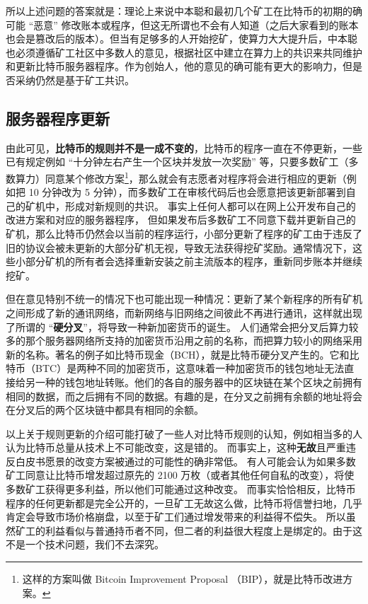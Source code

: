 所以上述问题的答案就是：理论上来说中本聪和最初几个矿工在比特币的初期的确可能 “恶意” 修改账本或程序，但这无所谓也不会有人知道（之后大家看到的账本也会是篡改后的版本）。但当有足够多的人开始挖矿，使算力大大提升后，中本聪也必须遵循矿工社区中多数人的意见，根据社区中建立在算力上的共识来共同维护和更新比特币服务器程序。作为创始人，他的意见的确可能有更大的影响力，但是否采纳仍然是基于矿工共识。

\subsection{服务器程序更新}
由此可见，\textbf{比特币的规则并不是一成不变的}，比特币的程序一直在不停更新，一些已有规定例如 “十分钟左右产生一个区块并发放一次奖励” 等，只要多数矿工（多数算力）同意某个修改方案\footnote{这样的方案叫做 Bitcoin Improvement Proposal （BIP），就是比特币改进方案。}，那么就会有志愿者对程序将会进行相应的更新（例如把 10 分钟改为 5 分钟），而多数矿工在审核代码后也会愿意把该更新部署到自己的矿机中，形成对新规则的共识。 事实上任何人都可以在网上公开发布自己的改进方案和对应的服务器程序， 但如果发布后多数矿工不同意下载并更新自己的矿机，那么比特币仍然会以当前的程序运行，小部分更新了程序的矿工由于违反了旧的协议会被未更新的大部分矿机无视，导致无法获得挖矿奖励。通常情况下，这些小部分矿机的所有者会选择重新安装之前主流版本的程序，重新同步账本并继续挖矿。

但在意见特别不统一的情况下也可能出现一种情况：更新了某个新程序的所有矿机之间形成了新的通讯网络，而新网络与旧网络之间彼此不再进行通讯，这样就出现了所谓的 “\textbf{硬分叉}”，将导致一种新加密货币的诞生。 人们通常会把分叉后算力较多的那个服务器网络所支持的加密货币沿用之前的名称，而把算力较小的网络采用新的名称。著名的例子如比特币现金（BCH），就是比特币硬分叉产生的。它和比特币（BTC）是两种不同的加密货币，这意味着一种加密货币的钱包地址无法直接给另一种的钱包地址转账。他们的各自的服务器中的区块链在某个区块之前拥有相同的数据，而之后拥有不同的数据。有趣的是，在分叉之前拥有余额的地址将会在分叉后的两个区块链中都具有相同的余额。

以上关于规则更新的介绍可能打破了一些人对比特币规则的认知，例如相当多的人认为比特币总量从技术上不可能改变，这是错的。 而事实上，这种\textbf{无故}且严重违反白皮书愿景的改变方案被通过的可能性的确非常低。 有人可能会认为如果多数矿工同意让比特币增发超过原先的 2100 万枚（或者其他任何自私的改变），将使多数矿工获得更多利益，所以他们可能通过这种改变。 而事实恰恰相反，比特币程序的任何更新都是完全公开的，一旦矿工无故这么做，比特币将信誉扫地，几乎肯定会导致市场价格崩盘，以至于矿工们通过增发带来的利益得不偿失。 所以虽然矿工的利益看似与普通持币者不同，但二者的利益很大程度上是绑定的。由于这不是一个技术问题，我们不去深究。

